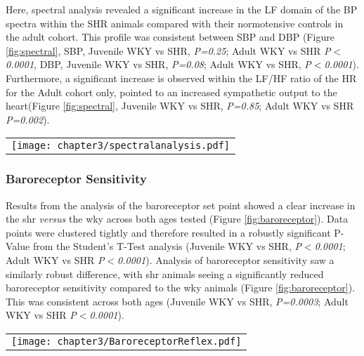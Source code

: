 Here, spectral analysis revealed a significant increase in the LF domain of the BP spectra within the SHR animals compared with their normotensive controls in the adult cohort. This profile was consistent between SBP and DBP (Figure \ref{fig:spectral}, SBP, Juvenile WKY vs SHR, \textit{P=0.25}; Adult WKY vs SHR \textit{P$<$0.0001}, DBP, Juvenile WKY vs SHR, \textit{P=0.08}; Adult WKY vs SHR, \textit{P$<$0.0001}). Furthermore, a significant increase is observed within the LF/HF ratio of the HR for the Adult cohort only, pointed to an increased sympathetic output to the heart(Figure \ref{fig:spectral}, Juvenile WKY vs SHR, \textit{P=0.85}; Adult WKY vs SHR \textit{P=0.002}). 

\begin{figure*}[!htbp]
\centering
\begin{tabular}{c}
  \texttt{[image: chapter3/spectralanalysis.pdf]}
\end{tabular}
\caption[Spectral Analysis for \acrshort{wky} \textit{versus} \acrshort{shr} comparison]{Spectral Analysis for \acrshort{wky} \textit{versus} \acrshort{shr} comparison. Statistics are presented as unpaired Student's T-Test P-values, between strains at any given age (P-value$<$0.05, *; P-value$<$0.01, **; P-value$<$0.001, ***).}
\label{fig:spectral}
\end{figure*}


\subsubsection{Baroreceptor Sensitivity}

Results from the analysis of the baroreceptor set point showed a clear increase in the \acrshort{shr} \textit{versus} the \acrshort{wky} across both ages tested (Figure \ref{fig:baroreceptor}). Data points were clustered tightly and therefore resulted in a robustly significant P-Value from the Student's T-Test analysis (Juvenile WKY vs SHR, \textit{P$<$0.0001}; Adult WKY vs SHR \textit{P$<$0.0001}). Analysis of baroreceptor sensitivity saw a similarly robust difference, with \acrshort{shr} animals seeing a significantly reduced baroreceptor sensitivity compared to the \acrshort{wky} animals (Figure \ref{fig:baroreceptor}). This was consistent across both ages (Juvenile WKY vs SHR, \textit{P=0.0003}; Adult WKY vs SHR \textit{P$<$0.0001}). 

\begin{figure*}[!htbp]
\centering
\begin{tabular}{c}
  \texttt{[image: chapter3/BaroreceptorReflex.pdf]}
\end{tabular}
\caption[Baroreceptor Sensitivity ($mmHg^{-1}$) and Set Point ($mmHg^{-1}$) for \acrshort{wky} \textit{versus} \acrshort{shr} comparison]{Baroreceptor Sensitivity ($mmHg^{-1}$) and Set Point ($mmHg^{-1}$) for \acrshort{wky} \textit{versus} \acrshort{shr} comparison. Statistics are presented as unpaired Student's T-Test P-values, between strains at any given age (P-value$<$0.05, *; P-value$<$0.01, **; P-value$<$0.001, ***).}
\label{fig:baroreceptor}
\end{figure*}


